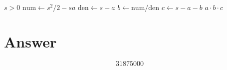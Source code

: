\documentclass[11pt]{article}
\begin{document}
\begin{algorithm}[H]
\caption{Find the Pythagorean triplet with $a+b+c=s$}
\begin{algorithmic}[1]
\REQUIRE $s > 0$
    \STATE $\mathrm{num} \gets s^2/2 - sa$
    \STATE $\mathrm{den} \gets s - a$
        \STATE $b \gets \mathrm{num} / \mathrm{den}$
        \STATE $c \gets s - a - b$
            \RETURN $a \cdot b \cdot c$
        \ENDIF
    \ENDIF
\ENDFOR
\end{algorithmic}
\end{algorithm}

\section{Answer}

\[
\boxed{31875000}
\]
\end{document}
